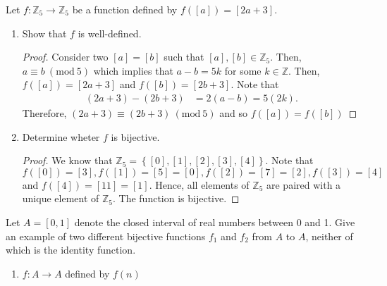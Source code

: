 \documentclass[12pt]{article}
\newcommand{\Z}{\mathbb{Z}}
\newcommand{\Mod}[1]{\ (\mathrm{mod}\ #1)}
\newenvironment{problem}[2][Problem]{\begin{trivlist} \item[\hskip \labelsep {\bfseries #1}\hskip \labelsep {\bfseries #2.}]}{\end{trivlist}}
\begin{document}
    \begin{problem}{31}
      Let $f:\Z_{5} \to \Z_{5}$ be a function defined by $f([a]) = [2a+3]$.
    \begin{enumerate}
      \item Show that $f$ is well-defined.
    \begin{proof}
      Consider two $[a]=[b]$ such that $[a],[b]\in \Z_{5}$. Then, $a \equiv b \Mod{5}$ which implies that $a-b=5k$ for some $k\in\Z$. Then, $f([a]) = [2a+3]$ and $f([b])=[2b+3]$. Note that 
    \begin{align*}
      (2a+3)-(2b+3) &= 2(a-b) = 5(2k).
    \end{align*}
    Therefore, $(2a+3)\equiv (2b+3) \Mod{5}$ and so $f([a]) = f([b])$
    \end{proof}
      \item Determine wheter $f$ is bijective.
    \begin{proof}
      We know that $\Z_{5} = \left\{ [0],[1],[2],[3],[4] \right\}$. Note that $f([0]) = [3], f([1])=[5]=[0], f([2])=[7]=[2], f([3])=[4]$ and $f([4])=[11]=[1]$. Hence, all elements of $\Z_{5}$ are paired with a unique element of $\Z_{5}$. The function is bijective.
    \end{proof}
    \end{enumerate}
    \end{problem}
    \begin{problem}{33}
      Let $A=[0,1]$ denote the closed interval of real numbers between 0 and 1. Give an example of two different bijective functions $f_{1}$ and $f_{2}$ from $A$ to $A$, neither of which is the identity function.
    \begin{enumerate}
      \item $f:A\to A$ defined by $f(n)$
    \end{enumerate}
    \end{problem}
\end{document}
